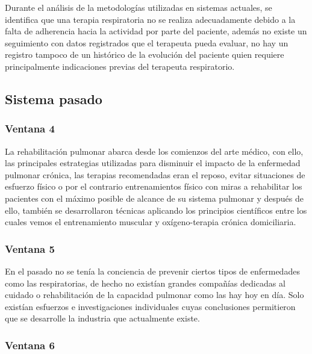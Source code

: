 \documentclass[12pt]{article}
\begin{document}



Durante el análisis de la metodologías utilizadas en sistemas actuales, se identifica que una terapia respiratoria no se realiza adecuadamente debido a la falta de adherencia hacia la actividad por parte del paciente, además no existe un seguimiento con datos registrados que el terapeuta pueda evaluar, no hay un registro tampoco de un histórico de la evolución del paciente quien requiere principalmente indicaciones previas del terapeuta respiratorio.

\subsection{Sistema pasado}

\subsubsection{Ventana 4}

La rehabilitación pulmonar abarca desde los comienzos del arte médico, con ello, las principales estrategias utilizadas para disminuir el impacto de la enfermedad pulmonar crónica, las terapias recomendadas eran el reposo, evitar situaciones de esfuerzo físico o por el contrario entrenamientos físico con miras a rehabilitar los pacientes con el máximo posible de alcance de su sistema pulmonar y después de ello, también se desarrollaron técnicas aplicando los principios científicos entre los cuales vemos el entrenamiento muscular y oxígeno-terapia crónica domiciliaria.

\subsubsection{Ventana 5}

En el pasado no se tenía la conciencia de prevenir ciertos tipos de enfermedades como las respiratorias, de hecho no existían grandes compañías dedicadas al cuidado o rehabilitación de la capacidad pulmonar como las hay hoy en día. Solo existían esfuerzos e investigaciones individuales cuyas conclusiones permitieron que se desarrolle la industria que actualmente existe.

\subsubsection{Ventana 6}
\end{document}
